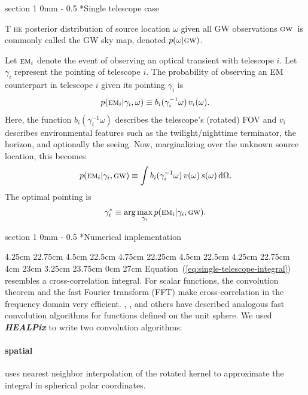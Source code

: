 \documentclass[landscape]{a0poster}
\makeatletter
\newcommand{\EM}[1]{\ensuremath{\textsc{\textrm{em}}_#1}}
\newcommand{\GW}{\ensuremath{\textsc{\textrm{gw}}}}
\newcommand{\dropcap}[2]{\lettrine{\fontspec{Copse}#1}{\textnormal{ #2}}}
\renewcommand{\section}{\@startsection
{section}%
{1}%
{0mm}%
{-\baselineskip}%
{0.5\baselineskip}%
{\fontspec{Marvel Bold}\Huge}} %
\renewcommand{\emph}[1]{{\bfseries\itshape#1}}
\makeatother
\begin{document}
\section*{Single telescope case}

\dropcap{T}{he} posterior distribution of source location $\omega$ given all GW observations \GW\ is commonly called the GW sky map, denoted $p(\omega | \GW)$.

Let $\EM{i}$ denote the event of observing an optical transient with telescope $i$.  Let $\gamma_i$ represent the pointing of telescope $i$.  The probability of observing an EM counterpart in telescope $i$ given its pointing $\gamma_i$ is
%
$$
	p(\EM{i} | \gamma_i, \omega) \equiv b_i(\gamma_i^{-1} \omega) \, v_i(\omega).
$$
%
Here, the function $b_i(\gamma_i^{-1} \omega)$ describes the telescope's (rotated) FOV and $v_i$ describes environmental features such as the twilight/nighttime terminator, the horizon, and optionally the seeing.
%
Now, marginalizing over the unknown source location, this becomes
%
\begin{equation}
	\label{eq:single-telescope-integral}
	p(\EM{i} | \gamma_i, \GW) \equiv \int b_i(\gamma_i^{-1} \omega) \, v(\omega) \, s(\omega) \, \mathrm{d}\Omega.
\end{equation}
%
The optimal pointing is
%
$$
	\gamma_i^* \equiv \arg \max_{\gamma_i} p(\EM{i} | \gamma_i, \GW).
$$

\framebreak

\section*{\hspace{3cm}Numerical implementation}

	4.25cm 22.75cm
	4.5cm 22.5cm
	4.75cm 22.25cm
	4.5cm 22.5cm
	4.25cm 22.75cm
	4cm 23cm
	3.25cm 23.75cm
	0cm 27cm  
Equation~(\ref{eq:single-telescope-integral}) resembles a cross-correlation integral.  For scalar functions, the convolution theorem and the fast Fourier transform (FFT) make cross-correlation in the frequency domain very efficient.  \citet{Driscoll1994202}, \citet{Wandelt:2001p13439}, and others have described analogous fast convolution algorithms for functions defined on the unit sphere.  We used \emph{HEALPix} to write two convolution algorithms:

\paragraph{spatial}
uses nearest neighbor interpolation of the rotated kernel to approximate the integral in spherical polar coordinates.
\end{document}
